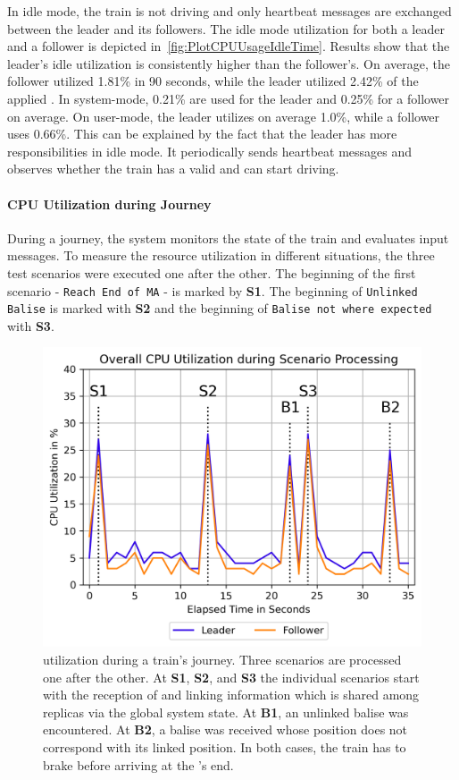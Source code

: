 In idle mode, the train is not driving and only heartbeat messages are exchanged between the leader and its followers.
The idle mode  utilization for both a leader and a follower is depicted in~\autoref{fig:PlotCPUUsageIdleTime}.
Results show that the leader's idle  utilization is consistently higher than the follower's.
On average, the follower utilized 1.81\% in 90 seconds, while the leader utilized 2.42\% of the applied .
In system-mode, 0.21\% are used for the leader and 0.25\% for a follower on average.
On user-mode, the leader utilizes on average 1.0\%, while a follower uses 0.66\%.
This can be explained by the fact that the leader has more responsibilities in idle mode.
It periodically sends heartbeat messages and observes whether the train has a valid  and can start driving.


\paragraph{CPU Utilization during Journey}

During a journey, the system monitors the state of the train and evaluates input messages.
To measure the resource utilization in different situations, the three test scenarios were executed one after the other.
The beginning of the first scenario - \texttt{Reach End of MA} - is marked by \textbf{S1}.
The beginning of \texttt{Unlinked Balise} is marked with \textbf{S2} and the beginning of \texttt{Balise not where expected} with \textbf{S3}.

\begin{figure}[!htb]
	\centering
	\includegraphics[width=0.8\linewidth]{images/plots/TotalCPUUsage}
	\caption{ utilization during a train's journey. Three scenarios are processed one after the other. At \textbf{S1}, \textbf{S2}, and \textbf{S3} the individual scenarios start with the reception of  and linking information which is shared among replicas via the global system state. At \textbf{B1}, an unlinked balise was encountered. At \textbf{B2}, a balise was received whose position does not correspond with its linked position. In both cases, the train has to brake before arriving at the 's end.}
	\label{fig:PlotTotalCPUUsage}
\end{figure}

